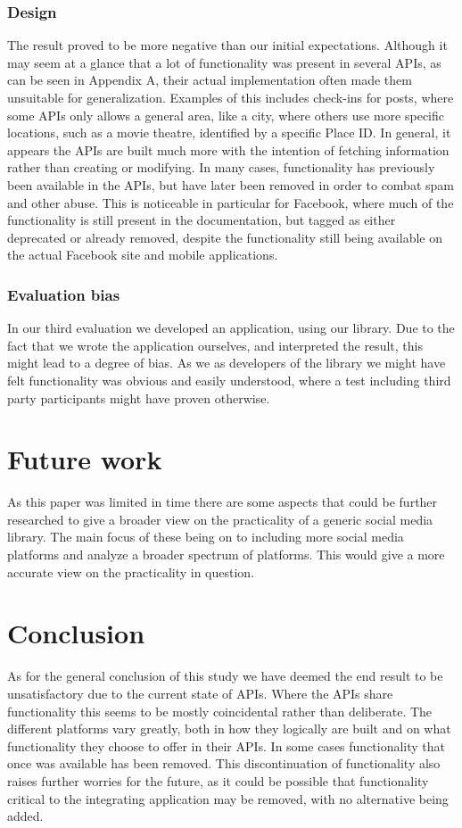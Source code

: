 \documentclass{sigchi-alternate}
\begin{document}
\subsubsection{Design}
The result proved to be more negative than our initial expectations. Although it may seem at a glance that a lot of functionality was present in several APIs, as can be seen in Appendix A, their actual implementation often made them
unsuitable for generalization. Examples of this includes check-ins for posts, where some APIs only allows a general area, like a city, where others use more specific locations, such as a movie theatre, identified by a specific Place ID. In general,
it appears the APIs are built much more with the intention of fetching information rather than creating or modifying. In many cases, functionality has previously been available in the APIs, but have later been removed in order to combat spam and other
abuse. This is noticeable in particular for Facebook, where much of the functionality is still present in the documentation, but tagged as either deprecated or already removed, despite the functionality still being available on the actual Facebook
site and mobile applications.

\subsubsection{Evaluation bias}
In our third evaluation we developed an application, using our library. Due to the fact that we wrote the application ourselves, and interpreted the result, this might lead to a degree of bias. As we as developers of the library we might
have felt functionality was obvious and easily understood, where a test including third party participants might have proven otherwise.

\section{Future work}
As this paper was limited in time there are some aspects that could be further researched to give a broader view on the practicality of a generic social media library. The main focus of these being on to including more social media platforms
and analyze a broader spectrum of platforms. This would give a more accurate view on the practicality in question. 

\section{Conclusion}
As for the general conclusion of this study we have deemed the end result to be unsatisfactory due to the current state of APIs. Where the APIs share functionality this seems to be mostly coincidental rather than deliberate. The different
platforms vary greatly, both in how they logically are built and on what functionality they choose to offer in their APIs. In some cases functionality that once was available has been removed. This discontinuation of functionality also
raises further worries for the future, as it could be possible that functionality critical to the integrating application may be removed, with no alternative being added.
\end{document}
